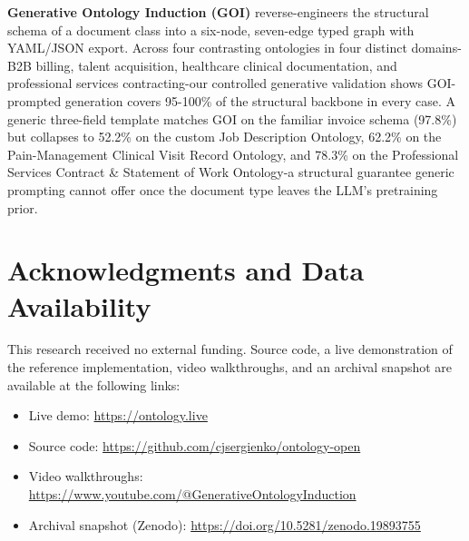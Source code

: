 \documentclass[runningheads,a4paper]{llncs}
\begin{document}
\textbf{Generative Ontology Induction (GOI)} reverse-engineers the
structural schema of a document class into a six-node, seven-edge
typed graph with YAML/JSON export. Across four contrasting
ontologies in four distinct domains-B2B billing, talent acquisition,
healthcare clinical documentation, and professional services
contracting-our controlled generative validation shows GOI-prompted
generation covers 95-100\% of the structural backbone in every case.
A generic three-field template matches GOI on the familiar invoice
schema (97.8\%) but collapses to 52.2\% on the custom Job Description
Ontology, 62.2\% on the Pain-Management Clinical Visit Record
Ontology, and 78.3\% on the Professional Services Contract \&
Statement of Work Ontology-a structural guarantee generic prompting
cannot offer once the document type leaves the LLM's pretraining
prior.

\section*{Acknowledgments and Data Availability}
This research received no external funding. Source code, a live
demonstration of the reference implementation, video walkthroughs,
and an archival snapshot are available at the following links:
\begin{itemize}
  \setlength{\itemsep}{0pt}
  \item Live demo: \url{https://ontology.live}
  \item Source code: \url{https://github.com/cjsergienko/ontology-open}
  \item Video walkthroughs: \url{https://www.youtube.com/@GenerativeOntologyInduction}
  \item Archival snapshot (Zenodo): \url{https://doi.org/10.5281/zenodo.19893755}
\end{itemize}
\end{document}
